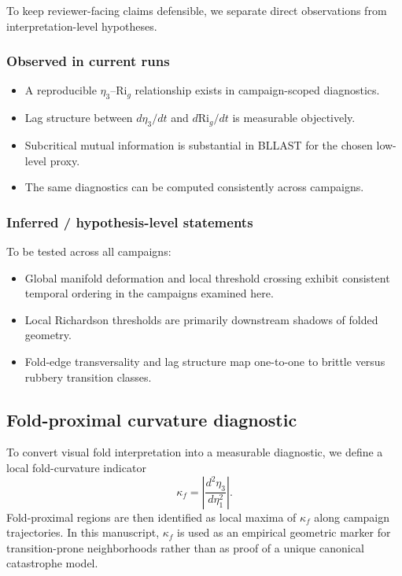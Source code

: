 \documentclass[12pt,a4paper]{article}
\newcommand{\Rig}{\mathrm{Ri}_g}
\begin{document}
To keep reviewer-facing claims defensible, we separate direct observations from interpretation-level hypotheses.

\subsubsection{Observed in current runs}

\begin{itemize}
  \item A reproducible $\eta_3$--$\Rig$ relationship exists in campaign-scoped diagnostics.
  \item Lag structure between $d\eta_3/dt$ and $d\Rig/dt$ is measurable objectively.
  \item Subcritical mutual information is substantial in BLLAST for the chosen low-level proxy.
  \item The same diagnostics can be computed consistently across campaigns.
\end{itemize}

\subsubsection{Inferred / hypothesis-level statements}

To be tested across all campaigns:
\begin{itemize}
  \item Global manifold deformation and local threshold crossing exhibit consistent temporal ordering in the campaigns examined here.
  \item Local Richardson thresholds are primarily downstream shadows of folded geometry.
  \item Fold-edge transversality and lag structure map one-to-one to brittle versus rubbery transition classes.
\end{itemize}

\subsection{Fold-proximal curvature diagnostic}

To convert visual fold interpretation into a measurable diagnostic, we define a local fold-curvature indicator
\begin{equation}
\kappa_f = \left|\frac{d^2\eta_3}{d\eta_1^2}\right|.
\end{equation}
Fold-proximal regions are then identified as local maxima of $\kappa_f$ along campaign trajectories. In this manuscript, $\kappa_f$ is used as an empirical geometric marker for transition-prone neighborhoods rather than as proof of a unique canonical catastrophe model.
\end{document}
